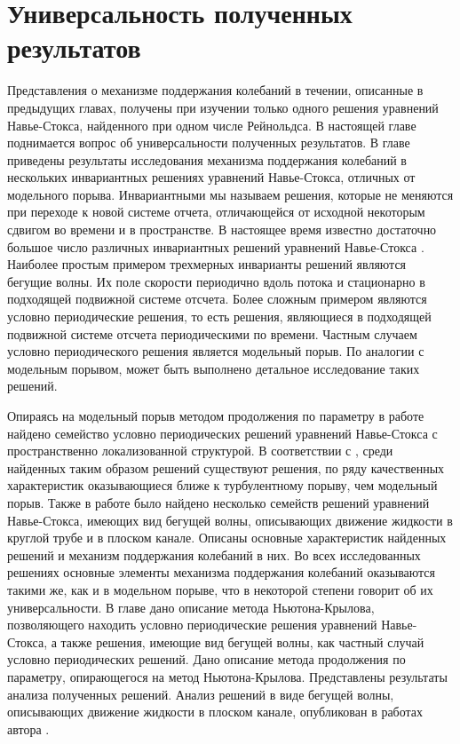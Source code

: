 
\chapter{Универсальность полученных результатов}

Представления о механизме поддержания колебаний в течении, описанные в предыдущих главах, получены при изучении только одного решения уравнений Навье-Стокса, найденного при одном числе Рейнольдса. В настоящей главе поднимается вопрос об универсальности полученных результатов. В главе приведены результаты исследования механизма поддержания колебаний в нескольких инвариантных решениях уравнений Навье-Стокса, отличных от модельного порыва. Инвариантными мы называем решения, которые не меняются при переходе к новой системе отчета, отличающейся от исходной некоторым сдвигом во времени и в пространстве. В настоящее время известно достаточно большое число различных инвариантных решений уравнений Навье-Стокса \cite{Kawahara2012}. Наиболее простым примером трехмерных инварианты решений являются бегущие волны. Их поле скорости периодично вдоль потока и стационарно в подходящей подвижной системе отсчета. Более сложным примером являются условно периодические решения, то есть решения, являющиеся в подходящей подвижной системе отсчета периодическими по времени. Частным случаем условно периодического решения является модельный порыв. По аналогии с модельным порывом, может быть выполнено детальное исследование таких решений. 


Опираясь на модельный порыв методом продолжения по параметру в работе найдено семейство условно периодических решений уравнений Навье-Стокса с пространственно локализованной структурой. В соответствии с \cite{Avila2013}, среди найденных таким образом решений существуют решения, по ряду качественных характеристик оказывающиеся ближе к турбулентному порыву, чем модельный порыв.  Также в работе было найдено несколько семейств решений уравнений Навье-Стокса, имеющих вид бегущей волны, описывающих движение жидкости в круглой трубе и в плоском канале. Описаны основные характеристик найденных решений и механизм поддержания колебаний в них. Во всех исследованных решениях основные элементы механизма поддержания колебаний оказываются такими же, как и в модельном порыве, что в некоторой степени говорит об их универсальности. В главе дано описание метода Ньютона-Крылова, позволяющего находить условно периодические решения уравнений Навье-Стокса, а также решения, имеющие вид бегущей волны, как частный случай условно периодических решений. Дано описание метода продолжения по параметру, опирающегося на метод Ньютона-Крылова. Представлены результаты анализа полученных решений. Анализ решений в виде бегущей волны, описывающих движение жидкости в плоском канале, опубликован в работах автора \cite{Vest18, KMU16}. 

